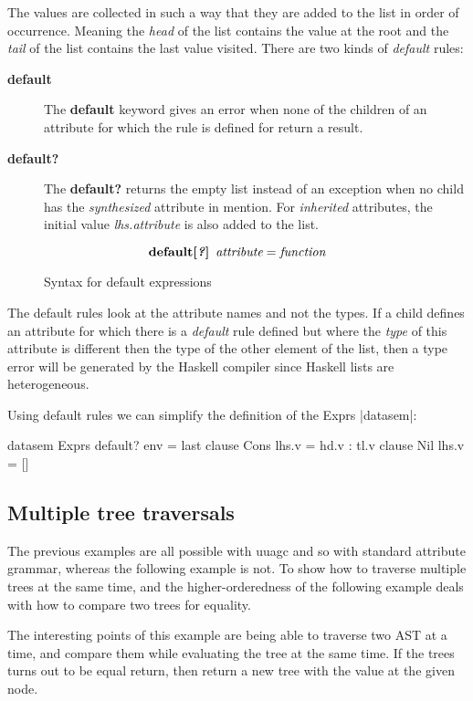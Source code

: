 The values are collected in such a way that they are added to the list in order of occurrence. Meaning the \emph{head} of the list contains the value at the root and the \emph{tail} of the list contains the last value visited. There are two kinds of \emph{default} rules:
\begin{description}
\item[\textbf{default}] { The \textbf{default} keyword gives an error when none of the children of an attribute for which the rule is defined for return a result. }
\item[\textbf{default?}] { The \textbf{default?} returns the empty list instead of an exception when no child has the \emph{synthesized} attribute in mention. For \emph{inherited} attributes, the initial value \emph{lhs.attribute} is also added to the list. }
\end{description}

\begin{figure}[h!]
\[
\textbf{default[\textit{?}]} \hspace{5pt} \emph{attribute} = \emph{function}
\]
\caption{Syntax for default expressions}
\label{default:syntax}
\end{figure}

The default rules look at the attribute names and not the types. If a child defines an attribute for which there is a \emph{default} rule defined but where the \emph{type} of this attribute is different then the type of the other element of the list, then a type error will be generated by the Haskell compiler since Haskell lists are heterogeneous.

Using default rules we can simplify the definition of the Exprs |datasem|:

\begin{code}
datasem Exprs
   default? env = last
   clause Cons
     lhs.v = hd.v : tl.v
   clause Nil
     lhs.v = []
\end{code}

\subsection{Multiple tree traversals}
The previous examples are all possible with uuagc and so with standard attribute grammar, whereas the following example is not. To show how to traverse multiple trees at the same time, and the higher-orderedness of \rcore the following example deals with how to compare two trees for equality.

The interesting points of this example are being able to traverse two AST at a time, and compare them while evaluating the tree at the same time.
If the trees turns out to be equal return, then return a new tree with the value at the given node.

